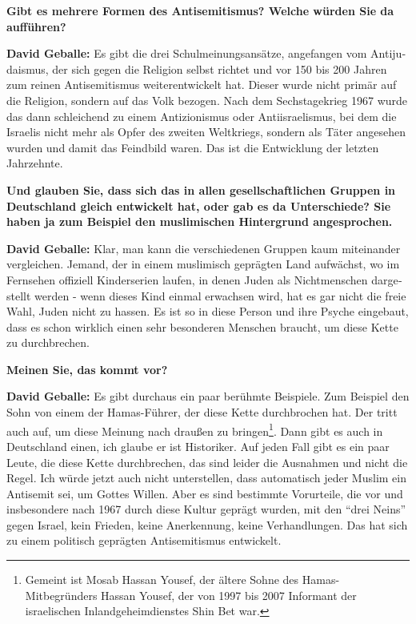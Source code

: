 \begin{otherlanguage}{ngerman}
\textbf{Gibt es mehrere Formen des Antisemitismus? Welche würden Sie da aufführen?}

\textbf{David Geballe:} Es gibt die drei Schulmeinungsansätze, angefangen vom Antijudaismus, der sich gegen die Religion selbst richtet und vor 150 bis 200 Jahren zum reinen Antisemitismus weiterentwickelt hat. Dieser wurde nicht primär auf die Religion, sondern auf das Volk bezogen. Nach dem Sechstagekrieg 1967 wurde das dann schleichend zu einem Antizionismus oder Antiisraelismus, bei dem die Israelis nicht mehr als Opfer des zweiten Weltkriegs, sondern als Täter angesehen wurden und damit das Feindbild waren. Das ist die Entwicklung der letzten Jahrzehnte. 

\textbf{Und glauben Sie, dass sich das in allen gesellschaftlichen Gruppen in Deutschland gleich entwickelt hat, oder gab es da Unterschiede? Sie haben ja zum Beispiel den muslimischen Hintergrund angesprochen.}

\textbf{David Geballe:} Klar, man kann die verschiedenen Gruppen kaum miteinander vergleichen. Jemand, der in einem muslimisch geprägten Land aufwächst, wo im Fernsehen offiziell Kinderserien laufen, in denen Juden als Nichtmenschen dargestellt werden - wenn dieses Kind einmal erwachsen wird, hat es gar nicht die freie Wahl, Juden nicht zu hassen. Es ist so in diese Person und ihre Psyche eingebaut, dass es schon wirklich einen sehr besonderen Menschen braucht, um diese Kette zu durchbrechen. 

\textbf{Meinen Sie, das kommt vor?} 

\textbf{David Geballe:} Es gibt durchaus ein paar berühmte Beispiele. Zum Beispiel den Sohn von einem der Hamas-Führer, der diese Kette durchbrochen hat. Der tritt auch auf, um diese Meinung nach draußen zu bringen\footnote{ Gemeint ist Mosab Hassan Yousef, der ältere Sohne des Hamas-Mitbegründers Hassan Yousef, der von 1997 bis 2007 Informant der israelischen Inlandgeheimdienstes Shin Bet war.}. Dann gibt es auch in Deutschland einen, ich glaube er ist Historiker. Auf jeden Fall gibt es ein paar Leute, die diese Kette durchbrechen, das sind leider die Ausnahmen und nicht die Regel. Ich würde jetzt auch nicht unterstellen, dass automatisch jeder Muslim ein Antisemit sei, um Gottes Willen. Aber es sind bestimmte Vorurteile, die vor und insbesondere nach 1967 durch diese Kultur geprägt wurden, mit den "`drei Neins"' gegen Israel, kein Frieden, keine Anerkennung, keine Verhandlungen. Das hat sich zu einem politisch geprägten Antisemitismus entwickelt. 


\end{otherlanguage}
